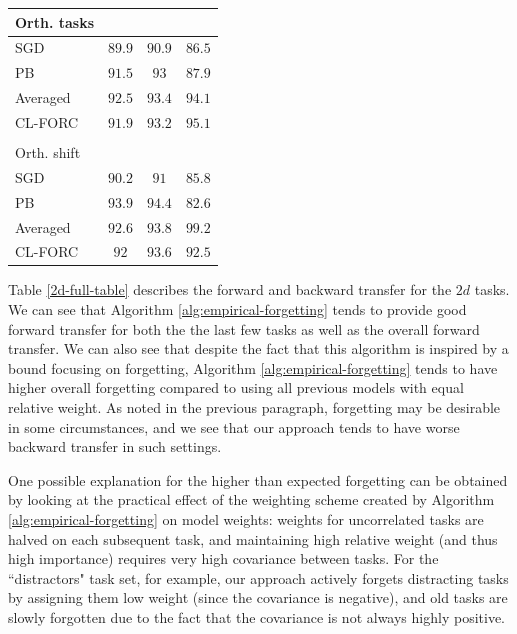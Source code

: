 \documentclass{article}
\theoremstyle{plain}
\theoremstyle{definition}
\theoremstyle{remark}
\begin{document}
\begin{table}[t]
\begin{center}
\begin{small}
\begin{sc}
\begin{tabular}{lccc}
\\ Orth. tasks & & & \\
\midrule
SGD    & $89.9$ & $90.9$ & $86.5$ \\
PB & $91.5$ & $93$ & $87.9$\\
Averaged    & $\mathbf{92.5}$ & $\mathbf{93.4}$ & $94.1$ \\
CL-FORC    & $91.9$& $93.2$ & $\mathbf{95.1}$        \\

\\ Orth. shift & & & \\
\midrule
SGD    & $90.2$ & $91$ & $85.8$ \\
PB & $\mathbf{93.9}$ & $\mathbf{94.4}$ & $82.6$\\
Averaged    & $92.6$ & $93.8$ & $\mathbf{99.2}$ \\
CL-FORC    & $92$& $93.6$ & $92.5$        \\

\bottomrule
\end{tabular}
\end{sc}
\end{small}
\end{center}
\vskip -0.1in
\end{table}

Table \ref{2d-full-table} describes the forward and backward transfer for the $2d$ tasks. We can see that Algorithm \ref{alg:empirical-forgetting} tends to provide good forward transfer for both the the last few tasks as well as the overall forward transfer. We can also see that despite the fact that this algorithm is inspired by a bound focusing on forgetting, Algorithm \ref{alg:empirical-forgetting} tends to have higher overall forgetting compared to using all previous models with equal relative weight. 
As noted in the previous paragraph, forgetting may be desirable in some circumstances, and we see that our approach tends to have worse backward transfer in such settings.

One possible explanation for the higher than expected forgetting can be obtained by looking at the practical effect of the weighting scheme created by Algorithm \ref{alg:empirical-forgetting} on model weights: weights for uncorrelated tasks are halved on each subsequent task, and maintaining high relative weight (and thus high importance) requires very high covariance between tasks. For the ``distractors" task set, for example, our approach actively forgets distracting tasks by assigning them low weight (since the covariance is negative), and old tasks are slowly forgotten due to the fact that the covariance is not always highly positive.
\end{document}
